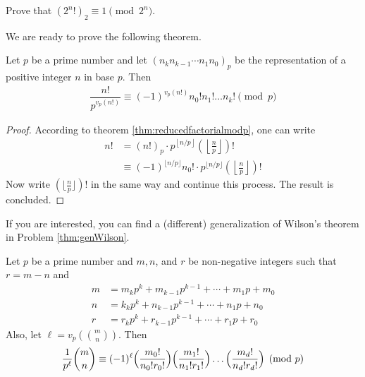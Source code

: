 \documentclass{subfile}
\begin{document}
	\begin{problem}
		Prove that $(2^n!)_2 \equiv 1 \pmod{2^n}$.
	\end{problem}

We are ready to prove the following theorem.

	\begin{theorem}\label{thm:wilsongeneral}
		Let $p$ be a prime number and let $(n_k n_{k-1}\cdots n_1 n_0)_p$ be the representation of a positive integer $n$ in base $p$. Then
			\begin{align}\label{eq:wilsongeneral}
				\dfrac{n!}{p^{v_p(n!)}}\equiv (-1)^{v_p(n!)} n_0!n_1!\dots n_k!\pmod p
			\end{align}
	\end{theorem}

	\begin{proof}
		According to theorem \eqref{thm:reducedfactorialmodp}, one can write
			\begin{align*}
				n!
					& = (n!)_p \cdot p^{\left\lfloor n/p\right\rfloor}\left(\left\lfloor\frac{n}{p}\right\rfloor\right)!\\
					& \equiv (-1)^{\lfloor n/p\rfloor} n_0! \cdot p^{\lfloor n/p \rfloor}\left(\left\lfloor\frac{n}{p}\right\rfloor\right)!
			\end{align*}
		Now write $(\lfloor \frac np\rfloor)!$ in the same way and continue this process. The result is concluded.
	\end{proof}

	\begin{note}
		If you are interested, you can find a (different) generalization of Wilson's theorem in Problem \ref{thm:genWilson}.
	\end{note}
	\begin{theorem}
		Let $p$ be a prime number and $m, n$, and $r$ be non-negative integers such that $r=m-n$ and
			\begin{align*}
				m&=m_kp^k+m_{k-1}p^{k-1}+\cdots +m_1p+m_0\\
				n&=k_kp^k+n_{k-1}p^{k-1}+\cdots +n_1p+n_0\\
				r&=r_kp^k+r_{k-1}p^{k-1}+\cdots +r_1p+r_0
			\end{align*}
		Also, let $\ell = v_p\left(\binom{m}{n}\right)$. Then
			\begin{align*}
				\frac1{p^\ell}\binom{m}{n}\equiv (-1)^\ell
				\Bigl(\frac{m_0!}{n_0!r_0!}\Bigr) \Bigl(\frac{m_1!}{n_1!r_1!}\Bigr) \dots \Bigl(\frac{m_d!}{n_d!r_d!}\Bigr) \pmod p
			\end{align*}
	\end{theorem}
\end{document}
